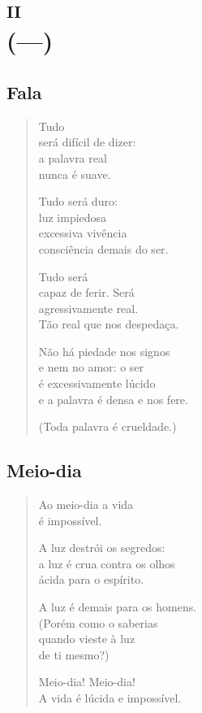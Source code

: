 \part*{\textsc{ii}\\ (---)}

\chapter{Fala}

\begin{verse}
Tudo\\
será difícil de dizer:\\
a palavra real\\
nunca é suave.

Tudo será duro:\\
luz impiedosa\\
excessiva vivência\\
consciência demais do ser.

Tudo será\\
capaz de ferir. Será\\
agressivamente real.\\
Tão real que nos despedaça.

Não há piedade nos signos\\
e nem no amor: o ser\\
é excessivamente lúcido\\
e a palavra é densa e nos fere.

(Toda palavra é crueldade.)
\end{verse}

\chapter{Meio-dia}

\begin{verse}
Ao meio-dia a vida\\
é impossível.

A luz destrói os segredos:\\
a luz é crua contra os olhos\\
ácida para o espírito.

A luz é demais para os homens.\\
(Porém como o saberias\\
quando vieste à luz\\
de ti mesmo?)

Meio-dia! Meio-dia!\\
A vida é lúcida e impossível.
\end{verse}

